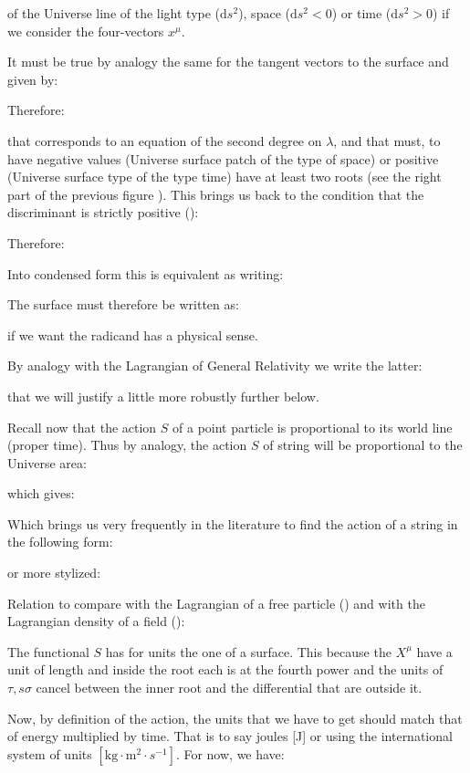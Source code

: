 	of the Universe line of the light type ($\mathrm{d}s^2$), space ($\mathrm{d}s^2<0$) or time ($\mathrm{d}s^2>0$) if we consider the four-vectors $x^\mu$.

	It must be true by analogy the same for the tangent vectors to the surface and given by:
	
	Therefore:
	
	that corresponds to an equation of the second degree on $\lambda$, and that must, to have negative values (Universe surface patch of the type of space) or positive (Universe surface type of the type time) have at least two roots (see the right part of the previous figure ). This brings us back to the condition that the discriminant is strictly positive ():
	
	Therefore:
	
	Into condensed form this is equivalent as writing:
	
	The surface must therefore be written as:
	
	if we want the radicand has a physical sense.
	
	By analogy with the Lagrangian of General Relativity we write the latter:
	
	that we will justify a little more robustly further below.
	
	Recall now that the action $S$ of a point particle is proportional to its world line (proper time). Thus by analogy, the action $S$ of string will be proportional to the Universe area:
	
	which gives:
	
	Which brings us very frequently in the literature to find the action of a string in the following form:
	
	or more stylized:
	
	Relation to compare with the Lagrangian of a free particle () and with the Lagrangian density of a field ():
	
	The functional $S$ has for units the one of a surface. This because the $X^\mu$ have a unit of length and inside the root each is at the fourth power and the units of $\tau,s\sigma$ cancel between the inner root and the differential that are outside it.
	
	Now, by definition of the action, the units that we have to get should match that of energy multiplied by time. That is to say joules [J] or using the international system of units $[\text{kg}\cdot\text{m}^2\cdot s^{-1}]$. For now, we have:
	
